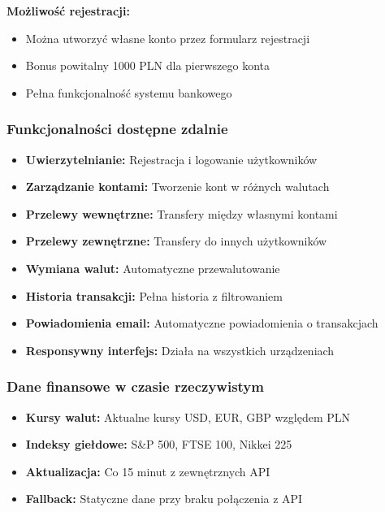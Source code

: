 \documentclass[12pt,a4paper]{article}
\begin{document}
    \textbf{Możliwość rejestracji:}
    \begin{itemize}
        \item Można utworzyć własne konto przez formularz rejestracji
        \item Bonus powitalny 1000 PLN dla pierwszego konta
        \item Pełna funkcjonalność systemu bankowego
    \end{itemize}

    \subsubsection{Funkcjonalności dostępne zdalnie}

    \begin{itemize}
        \item \textbf{Uwierzytelnianie:} Rejestracja i logowanie użytkowników
        \item \textbf{Zarządzanie kontami:} Tworzenie kont w różnych walutach
        \item \textbf{Przelewy wewnętrzne:} Transfery między własnymi kontami
        \item \textbf{Przelewy zewnętrzne:} Transfery do innych użytkowników
        \item \textbf{Wymiana walut:} Automatyczne przewalutowanie
        \item \textbf{Historia transakcji:} Pełna historia z filtrowaniem
        \item \textbf{Powiadomienia email:} Automatyczne powiadomienia o transakcjach
        \item \textbf{Responsywny interfejs:} Działa na wszystkich urządzeniach
    \end{itemize}

    \subsubsection{Dane finansowe w czasie rzeczywistym}

    \begin{itemize}
        \item \textbf{Kursy walut:} Aktualne kursy USD, EUR, GBP względem PLN
        \item \textbf{Indeksy giełdowe:} S\&P 500, FTSE 100, Nikkei 225
        \item \textbf{Aktualizacja:} Co 15 minut z zewnętrznych API
        \item \textbf{Fallback:} Statyczne dane przy braku połączenia z API
    \end{itemize}
\end{document}
